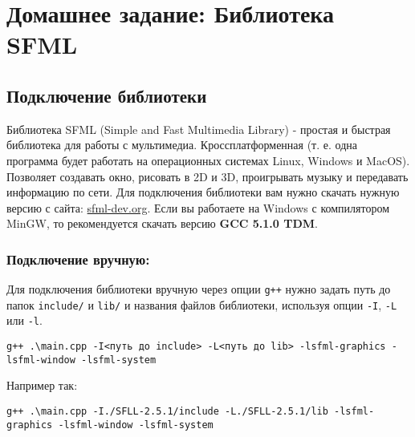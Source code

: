\documentclass{article}
\begin{document}



\section*{Домашнее задание: Библиотека SFML}
\subsection*{Подключение библиотеки}
Библиотека SFML (Simple and Fast Multimedia Library) - простая и быстрая библиотека для работы с мультимедиа. Кроссплатформенная (т. е. одна программа будет работать на операционных системах Linux, Windows и MacOS). Позволяет создавать окно, рисовать в 2D и 3D, проигрывать музыку и передавать информацию по сети. Для подключения библиотеки вам нужно скачать нужную версию с сайта: \href{https://www.sfml-dev.org/}{sfml-dev.org}. Если вы работаете на Windows с компилятором MinGW, то рекомендуется скачать версию \textbf{GCC 5.1.0 TDM}.

\subsubsection*{Подключение вручную:}
Для подключения библиотеки вручную через опции \texttt{g++} нужно задать путь до папок \texttt{include/} и \texttt{lib/} и названия файлов библиотеки, используя опции \texttt{-I}, \texttt{-L} или \texttt{-l}. 
\begin{verbatim}
g++ .\main.cpp -I<путь до include> -L<путь до lib> -lsfml-graphics -lsfml-window -lsfml-system
\end{verbatim}
Например так:
\begin{verbatim}
g++ .\main.cpp -I./SFLL-2.5.1/include -L./SFLL-2.5.1/lib -lsfml-graphics -lsfml-window -lsfml-system
\end{verbatim}
\end{document}
